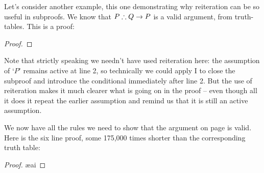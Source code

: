Let's consider another example, this one demonstrating why reiteration can be so useful in subproofs. We know that $P \mathrel{\therefore} Q \rightarrow P$ is a valid argument, from truth-tables. This is a proof: \begin{proof}
	\open
	\close
\end{proof} Note that strictly speaking we needn't have used reiteration here: the assumption of `$P$' remains active at line 2, so technically we could apply {\eif}I to close the subproof and introduce the conditional immediately after line 2. But the use of reiteration makes it much clearer what is going on in the proof – even though all it does it repeat the earlier assumption and remind us that it is still an active assumption. 


We now have all the rules we need to show that the argument on page \pageref{longtt} is valid. Here is the six line proof,  some 175,000 times shorter  than the corresponding truth table:\label{ndshort}

\hspace{-2.25cm}\begin{minipage}{\textwidth}\small\begin{proof}
	\open
		\ae{ai}
		\close
\end{proof}\end{minipage}



